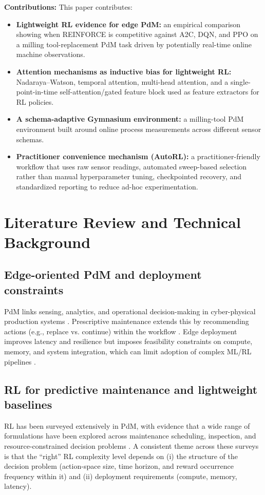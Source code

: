 \documentclass[sn-basic]{sn-jnl} %
\begin{document}
\textbf{Contributions:}
This paper contributes:
\begin{itemize}
    \item \textbf{Lightweight RL evidence for edge PdM:} an empirical comparison showing when \textsc{REINFORCE} is competitive against \textsc{A2C}, \textsc{DQN}, and \textsc{PPO} on a milling tool-replacement PdM task driven by potentially real-time online machine observations.
    \item \textbf{Attention mechanisms as inductive bias for lightweight RL:} Nadaraya--Watson, temporal attention, multi-head attention, and a single-point-in-time self-attention/gated feature block used as feature extractors for RL policies.
    \item \textbf{A schema-adaptive Gymnasium environment:} a milling-tool PdM environment built around online process measurements across different sensor schemas.
    \item \textbf{Practitioner convenience mechanism (AutoRL):} a practitioner-friendly workflow that uses raw sensor readings, automated sweep-based selection rather than manual hyperparameter tuning, checkpointed recovery, and standardized reporting to reduce ad-hoc experimentation.
\end{itemize}

\section{Literature Review and Technical Background}
\label{sec:lit_tech}
\subsection{Edge-oriented PdM and deployment constraints}
PdM links sensing, analytics, and operational decision-making in cyber-physical production systems \cite{Compare2020, Zonta2020}. Prescriptive maintenance extends this by recommending actions (e.g., replace vs. continue) within the workflow \cite{Ansari2019}. Edge deployment improves latency and resilience but imposes feasibility constraints on compute, memory, and system integration, which can limit adoption of complex ML/RL pipelines \cite{Njor2024, Pandey2023}.

\subsection{RL for predictive maintenance and lightweight baselines}
RL has been surveyed extensively in PdM, with evidence that a wide range of formulations have been explored across maintenance scheduling, inspection, and resource-constrained decision problems \cite{Siraskar2023, Ogunfowora2023, Zhang2024}. A consistent theme across these surveys is that the ``right'' RL complexity level depends on (i) the structure of the decision problem (action-space size, time horizon, and reward occurrence frequency within it) and (ii) deployment requirements (compute, memory, latency).
\end{document}
